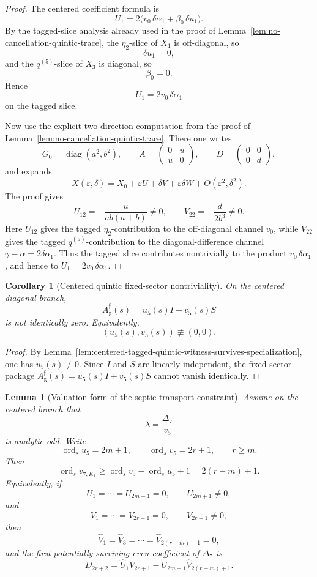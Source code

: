 \documentclass[11pt,a4paper]{amsart}
\theoremstyle{plain}
\newtheorem{lemma}[theorem]{Lemma}
\newtheorem{corollary}[theorem]{Corollary}
\theoremstyle{definition}
\begin{document}
\begin{proof}
The centered coefficient formula is
\[
U_1=2\bigl(v_0\,\delta\alpha_1+\beta_0\,\delta u_1\bigr).
\]
By the tagged-slice analysis already used in the proof of
Lemma~\ref{lem:no-cancellation-quintic-trace}, the $\eta_2$-slice of $X_1$
is off-diagonal, so
\[
\delta u_1=0,
\]
and the $q^{(5)}$-slice of $X_3$ is diagonal, so
\[
\beta_0=0.
\]
Hence
\[
U_1=2v_0\,\delta\alpha_1
\]
on the tagged slice.

Now use the explicit two-direction computation from the proof of
Lemma~\ref{lem:no-cancellation-quintic-trace}. There one writes
\[
G_0=\operatorname{diag}(a^2,b^2),
\qquad
A=
\begin{pmatrix}
0&u\\u&0
\end{pmatrix},
\qquad
D=
\begin{pmatrix}
0&0\\0&d
\end{pmatrix},
\]
and expands
\[
X(\varepsilon,\delta)
=
X_0+\varepsilon U+\delta V+\varepsilon\delta W+O(\varepsilon^2,\delta^2).
\]
The proof gives
\[
U_{12}=-\frac{u}{ab(a+b)}\neq 0,
\qquad
V_{22}=-\frac{d}{2b^3}\neq 0.
\]
Here $U_{12}$ gives the tagged $\eta_2$-contribution to the off-diagonal
channel $v_0$, while $V_{22}$ gives the tagged $q^{(5)}$-contribution to the
diagonal-difference channel $\gamma-\alpha=2\delta\alpha_1$. Thus the tagged
slice contributes nontrivially to the product $v_0\,\delta\alpha_1$, and hence
to $U_1=2v_0\,\delta\alpha_1$.
\end{proof}

\begin{corollary}[Centered quintic fixed-sector nontriviality]
\label{cor:centered-quintic-fixed-sector-nontriviality}
On the centered diagonal branch,
\[
A_5^{\mathfrak f}(s)=u_5(s)I+v_5(s)S
\]
is not identically zero. Equivalently,
\[
(u_5(s),v_5(s))\not\equiv (0,0).
\]
\end{corollary}

\begin{proof}
By Lemma~\ref{lem:centered-tagged-quintic-witness-survives-specialization},
one has $u_5(s)\not\equiv 0$. Since $I$ and $S$ are linearly independent,
the fixed-sector package $A_5^{\mathfrak f}(s)=u_5(s)I+v_5(s)S$ cannot vanish
identically.
\end{proof}

\begin{lemma}[Valuation form of the septic transport constraint]
\label{lem:valuation-form-septic-transport-constraint}
Assume on the centered branch that
\[
\lambda=\frac{\Delta_7}{v_5}
\]
is analytic odd. Write
\[
\operatorname{ord}_s u_5=2m+1,
\qquad
\operatorname{ord}_s v_5=2r+1,
\qquad
r\ge m.
\]
Then
\[
\operatorname{ord}_s v_{7,K_1}\ge \operatorname{ord}_s v_5-\operatorname{ord}_s u_5+1=2(r-m)+1.
\]
Equivalently, if
\[
U_1=\cdots=U_{2m-1}=0,\qquad U_{2m+1}\neq 0,
\]
and
\[
V_1=\cdots=V_{2r-1}=0,\qquad V_{2r+1}\neq 0,
\]
then
\[
\widehat V_1=\widehat V_3=\cdots=\widehat V_{2(r-m)-1}=0,
\]
and the first potentially surviving even coefficient of $\Delta_7$ is
\[
D_{2r+2}=\widehat U_1V_{2r+1}-U_{2m+1}\widehat V_{2(r-m)+1}.
\]
\end{lemma}
\end{document}
